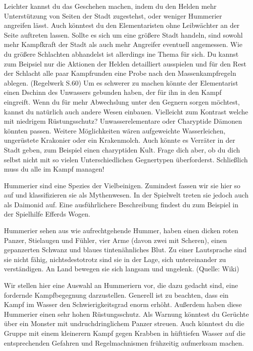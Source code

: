 Leichter kannst du das Geschehen machen, indem du den Helden mehr Unterstützung von Seiten der Stadt zugestehst, oder weniger Hummerier angreifen lässt. Auch könntest du den Elementaristen ohne Leibwächter an der Seite auftreten lassen. 
\newline
Sollte es sich um eine größere Stadt handeln, sind sowohl mehr Kampfkraft der Stadt als auch mehr Angreifer eventuell angemessen. Wie du größere Schlachten abhandelst ist allerdings ine Thema für sich. Du kannst zum Beipsiel nur die Aktionen der Helden detailliert ausspielen und für den Rest der Schlacht alle paar Kampfrunden eine Probe nach den Massenkampfregeln ablegen. (Regelwerk S.60)
\newline
Um es schwerer zu machen könnte der Elementarist einen Dschinn des Unwassers gebunden haben, der für ihn in den Kampf eingreift. 
\newline
Wenn du für mehr Abwechslung unter den Gegnern sorgen möchtest, kannst du natürlich auch andere Wesen einbauen. Vielleicht zum Kontrast welche mit niedrigem Rüstungsschutz? Unwasserelementare oder Charyptide Dämonen könnten passen. Weitere Möglichkeiten wären aufgeweichte Wasserleichen, ungerüstete Krakonier oder ein Krakenmolch. Auch könnte es Verräter in der Stadt geben, zum Beispiel einen charyptiden Kult. Frage dich aber, ob du dich selbst nicht mit so vielen Unterschiedlichen Gegnertypen überforderst. Schließlich muss du alle im Kampf managen!



Hummerier sind eine Spezies der Vielbeinigen. Zumindest fassen wir sie hier so auf und klassifizieren sie als Mythenwesen. In der Spielwelt treten sie jedoch auch als Daimonid auf. Eine ausführlichere Beschreibung findest du zum Beispiel in der Spielhilfe Efferds Wogen.

Hummerier sehen aus wie aufrechtgehende Hummer, haben einen dicken roten Panzer, Stielaugen und Fühler, vier Arme (davon zwei mit Scheren), einen gepanzerten Schwanz und blaues tintenähnliches Blut. Zu einer Lautsprache sind sie nicht fähig, nichtsdestotrotz sind sie in der Lage, sich untereinander zu verständigen. An Land bewegen sie sich langsam und ungelenk. (Quelle: Wiki)

Wir stellen hier eine Auswahl an Hummeriern vor, die dazu gedacht sind, eine fordernde Kampfbegegnung darzustellen. Generell ist zu beachten, dass ein Kampf im Wasser den Schwierigkeitsgrad enorm erhöht. Außerdem haben diese Hummerier einen sehr hohen Rüstungsschutz. Als Warnung könntest du Gerüchte über ein Monster mit undruchdringlichem Panzer streuen. Auch könntest du die Gruppe mit einem kleinerern Kampf gegen Krabben in hüfttiefen Wasser auf die entsprechenden Gefahren und Regelmachnismen frühzeitig aufmerksam machen.

